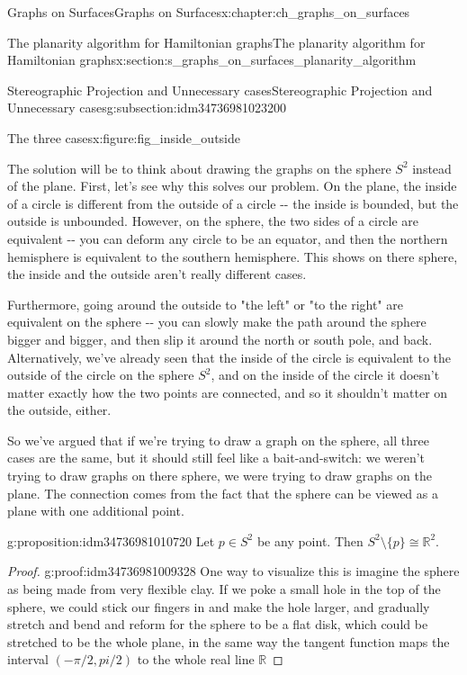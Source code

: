 \documentclass[oneside,10pt,]{book}
\numberwithin{equation}{section}
\newcommand{\reals}{\mathbb{R}}
\begin{document}
\begin{chapterptx}{Graphs on Surfaces}{}{Graphs on Surfaces}{}{}{x:chapter:ch_graphs_on_surfaces}
\begin{sectionptx}{The planarity algorithm for Hamiltonian graphs}{}{The planarity algorithm for Hamiltonian graphs}{}{}{x:section:s_graphs_on_surfaces_planarity_algorithm}
\begin{subsectionptx}{Stereographic Projection and Unnecessary cases}{}{Stereographic Projection and Unnecessary cases}{}{}{g:subsection:idm34736981023200}
\begin{figureptx}{The three cases}{x:figure:fig_inside_outside}{}
\begin{image}{0.15}{0.7}{0.15}
{\begin{tikzpicture}[scale=.7]
\end{tikzpicture}
}%
\end{image}%
\tcblower
\end{figureptx}%
The solution will be to think about drawing the graphs on the sphere \(S^2\) instead of the plane.  First, let's see why this solves our problem.  On the plane, the inside of a circle is different from the outside of a circle -{}-{} the inside is bounded, but the outside is unbounded.  However, on the sphere, the two sides of a circle are equivalent -{}-{} you can deform any circle to be an equator, and then the northern hemisphere is equivalent to the southern hemisphere. This shows on there sphere, the inside and the outside aren't really different cases.%
\par
Furthermore, going around the outside to "the left" or "to the right" are equivalent on the sphere -{}-{} you can slowly make the path around the sphere bigger and bigger, and then slip it around the north or south pole, and back.  Alternatively, we've already seen that the inside of the circle is equivalent to the outside of the circle on the sphere \(S^2\), and on the inside of the circle it doesn't matter exactly how the two points are connected, and so it shouldn't matter on the outside, either.%
\par
So we've argued that if we're trying to draw a graph on the sphere, all three cases are the same, but it should still feel like a bait-and-switch: we weren't trying to draw graphs on there sphere, we were trying to draw graphs on the plane.  The connection comes from the fact that the sphere can be viewed as a plane with one additional point.%
\begin{proposition}{}{}{g:proposition:idm34736981010720}%
Let \(p\in S^2\) be any point.  Then \(S^2\setminus\{p\}\cong\reals^2\).\end{proposition}
\begin{proof}{}{g:proof:idm34736981009328}
One way to visualize this is imagine the sphere as being made from very flexible clay.  If we poke a small hole in the top of the sphere, we could stick our fingers in and make the hole larger, and gradually stretch and bend and reform for the sphere to be a flat disk, which could be stretched to be the whole plane, in the same way the tangent function maps the interval \((-\pi/2, pi/2)\) to the whole real line \(\reals\)%
\par

\end{proof}
\end{subsectionptx}
\end{sectionptx}
\end{chapterptx}
\end{document}
